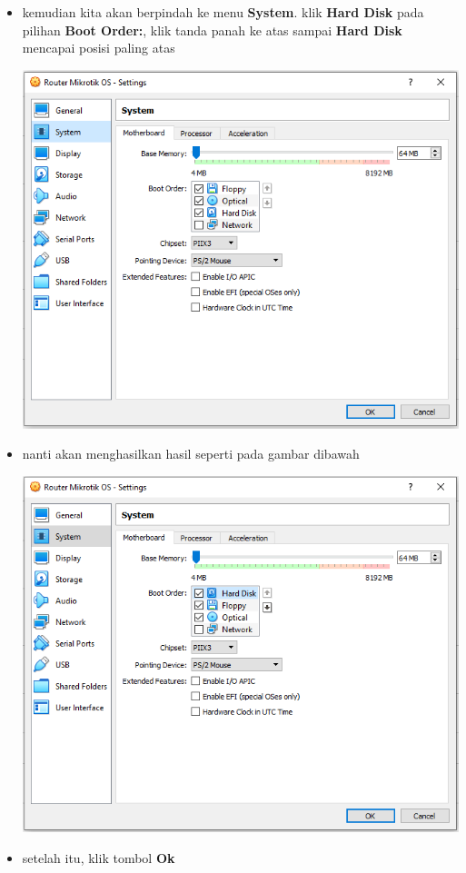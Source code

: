 \documentclass{article}
\begin{document}
\begin{flushleft}
\begin{itemize}
			\item kemudian kita akan berpindah ke menu \textbf{System}. klik \textbf{Hard Disk} pada pilihan \textbf{Boot Order:}, klik tanda panah ke atas sampai \textbf{Hard Disk} mencapai posisi paling atas 
				\begin{center}
					\includegraphics[scale=0.6]{(e)}
				\end{center}
			
			\item nanti akan menghasilkan hasil seperti pada gambar dibawah 
				\begin{center}
					\includegraphics[scale=0.6]{(e)true}
				\end{center}
						
			\item setelah itu, klik tombol \textbf{Ok}
					        	
        	
        \end{itemize}
		
    \end{flushleft}
\end{document}
